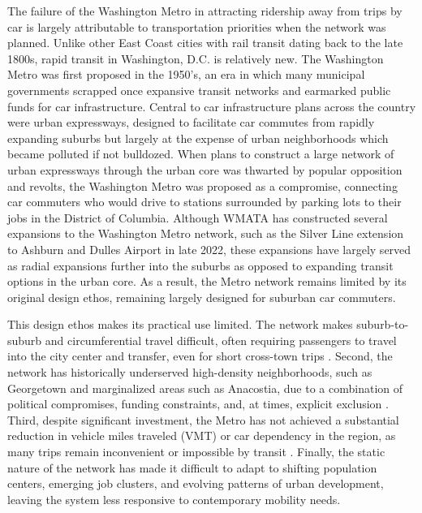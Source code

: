 \documentclass[manuscript,screen,review]{acmart}
\begin{document}
The failure of the Washington Metro in attracting ridership away from trips by car is largely attributable to transportation priorities when the network was planned. Unlike other East Coast cities with rail transit dating back to the late 1800s, rapid transit in Washington, D.C. is relatively new. The Washington Metro was first proposed in the 1950's, an era in which many municipal governments scrapped once expansive transit networks and earmarked public funds for car infrastructure. Central to car infrastructure plans across the country were urban expressways, designed to facilitate car commutes from rapidly expanding suburbs but largely at the expense of urban neighborhoods which became polluted if not bulldozed. When plans to construct a large network of urban expressways through the urban core was thwarted by popular opposition and revolts, the Washington Metro was proposed as a compromise, connecting car commuters who would drive to stations surrounded by parking lots to their jobs in the District of Columbia. Although WMATA has constructed several expansions to the Washington Metro network, such as the Silver Line extension to Ashburn and Dulles Airport in late 2022, these expansions have largely served as radial expansions further into the suburbs as opposed to expanding transit options in the urban core. As a result, the Metro network remains limited by its original design ethos, remaining largely designed for suburban car commuters. 

This design ethos makes its practical use limited. The network makes suburb-to-suburb and circumferential travel difficult, often requiring passengers to travel into the city center and transfer, even for short cross-town trips \cite{bib:bast2016route}. Second, the network has historically underserved high-density neighborhoods, such as Georgetown and marginalized areas such as Anacostia, due to a combination of political compromises, funding constraints, and, at times, explicit exclusion \cite{bib:overview-field}. Third, despite significant investment, the Metro has not achieved a substantial reduction in vehicle miles traveled (VMT) or car dependency in the region, as many trips remain inconvenient or impossible by transit \cite{bib:wmata-vmt}. Finally, the static nature of the network has made it difficult to adapt to shifting population centers, emerging job clusters, and evolving patterns of urban development, leaving the system less responsive to contemporary mobility needs.
\end{document}
